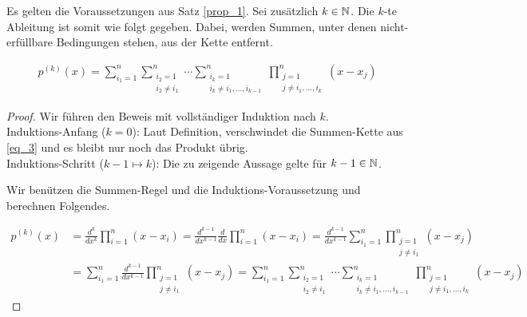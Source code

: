 \begin{corollary}

Es gelten die Voraussetzungen aus Satz \ref{prop_1}.
Sei zusätzlich $k \in \mathbb{N}$.
Die $k$-te Ableitung ist somit wie folgt gegeben.
Dabei, werden Summen, unter denen nicht-erfüllbare Bedingungen stehen, aus der Kette entfernt.

\begin{align} \label{eq_3}
  p^{(k)}(x)
  =
  \sum_{i_1 = 1}^n
  \sum_{\substack{i_2 = 1 \\ i_2 \neq i_1}}^n
  \cdots
  \sum_{\substack{i_k = 1 \\ i_k \neq i_1, \ldots, i_{k-1}}}^n
  \prod_{\substack{j = 1 \\ j \neq i_1, \ldots, i_k}}^n
  (x - x_j)
\end{align}

\end{corollary}

\begin{proof}

Wir führen den Beweis mit vollständiger Induktion nach $k$. \\

Induktions-Anfang ($k = 0$):
Laut Definition, verschwindet die Summen-Kette aus \eqref{eq_3} und es bleibt nur noch das Produkt übrig. \\

Induktions-Schritt ($k-1 \mapsto k$):
Die zu zeigende Aussage gelte für $k-1 \in \mathbb{N}$.

Wir benützen die Summen-Regel und die Induktions-Voraussetzung und berechnen Folgendes.

\begin{align*}
  p^{(k)}(x)
  & =
  \frac{d^k}{dx^k}
  \prod_{i=1}^{n} (x - x_i)
  =
  \frac{d^{k-1}}{dx^{k-1}}
  \frac{d}{dx}
  \prod_{i=1}^{n} (x - x_i)
  =
  \frac{d^{k-1}}{dx^{k-1}}
  \sum_{i_1 = 1}^n
  \prod_{\substack{j=1 \\ j \neq i_1}}^n
  (x - x_j) \\
  & =
  \sum_{i_1 = 1}^n
  \frac{d^{k-1}}{dx^{k-1}}
  \prod_{\substack{j=1 \\ j \neq i_1}}^n
  (x - x_j)
  =
  \sum_{i_1 = 1}^n
  \sum_{\substack{i_2 = 1 \\ i_2 \neq i_1}}^n
  \cdots
  \sum_{\substack{i_k = 1 \\ i_k \neq i_1, \ldots, i_{k-1}}}^n
  \prod_{\substack{j = 1 \\ j \neq i_1, \ldots, i_k}}^n
  (x - x_j)
\end{align*}

\end{proof}
